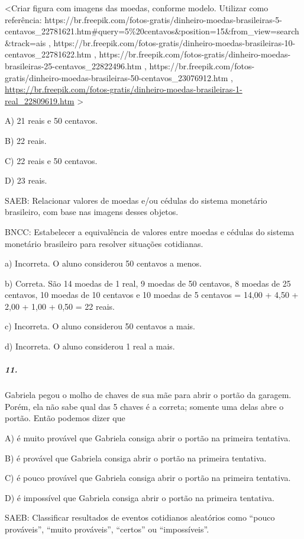 \textless{}Criar figura com imagens das moedas, conforme modelo.
Utilizar como referência:
https://br.freepik.com/fotos-gratis/dinheiro-moedas-brasileiras-5-centavos\_22781621.htm\#query=5\%20centavos\&position=15\&from\_view=search\&track=ais
,
https://br.freepik.com/fotos-gratis/dinheiro-moedas-brasileiras-10-centavos\_22781622.htm
,
https://br.freepik.com/fotos-gratis/dinheiro-moedas-brasileiras-25-centavos\_22822496.htm
,
https://br.freepik.com/fotos-gratis/dinheiro-moedas-brasileiras-50-centavos\_23076912.htm
,
\url{https://br.freepik.com/fotos-gratis/dinheiro-moedas-brasileiras-1-real_22809619.htm}
\textgreater{}

A) 21 reais e 50 centavos.

B) 22 reais.

C) 22 reais e 50 centavos.

D) 23 reais.

SAEB: Relacionar valores de moedas e/ou cédulas do sistema
monetário brasileiro, com base nas imagens desses objetos.

BNCC: Estabelecer a equivalência de valores entre moedas e
cédulas do sistema monetário brasileiro para resolver situações
cotidianas.

a) Incorreta. O aluno considerou 50 centavos a menos.

b) Correta. São 14 moedas de 1 real, 9 moedas de 50 centavos, 8 moedas
de 25 centavos, 10 moedas de 10 centavos e 10 moedas de 5 centavos =
14,00 + 4,50 + 2,00 + 1,00 + 0,50 = 22 reais.

c) Incorreta. O aluno considerou 50 centavos a mais.

d) Incorreta. O aluno considerou 1 real a mais.

\subparagraph{11.}\label{section-110}

Gabriela pegou o molho de chaves de sua mãe para abrir o portão da
garagem. Porém, ela não sabe qual das 5 chaves é a correta; somente uma
delas abre o portão. Então podemos dizer que

A) é muito provável que Gabriela consiga abrir o portão na primeira tentativa.

B) é provável que Gabriela consiga abrir o portão na primeira tentativa.

C) é pouco provável que Gabriela consiga abrir o portão na primeira tentativa.

D) é impossível que Gabriela consiga abrir o portão na primeira tentativa.

SAEB: Classificar resultados de eventos cotidianos aleatórios
como ``pouco prováveis'', ``muito prováveis'', ``certos'' ou
``impossíveis''.

